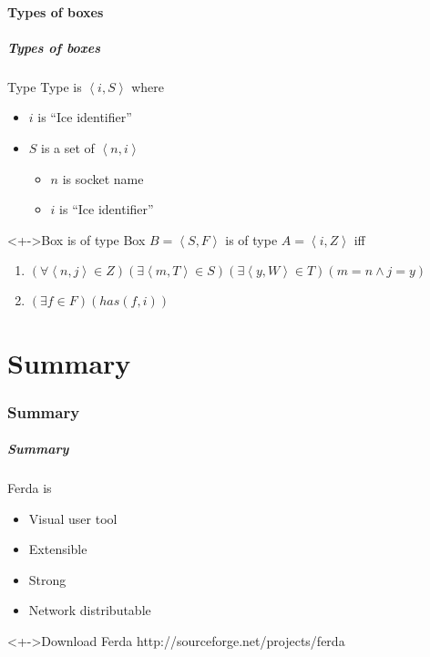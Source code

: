 \documentclass[handout]{beamer}
\begin{document}
\subsection{Types of boxes}
\begin{frame}
	\frametitle{Types of boxes}
	\begin{block}{Type}
		Type is $\left<i,S\right>$ where
		\begin{itemize}[<+->]
			\item $i$ is ``Ice identifier''
			\item $S$ is a set of $\left<n,i\right>$
			\begin{itemize}[<+->]
				\item $n$ is socket name
				\item $i$ is ``Ice identifier''
			\end{itemize}
		\end{itemize}
	\end{block}	
	\begin{block}<+->{Box is of type}
		Box $B=\left<S,F\right>$ is of type $A=\left<i,Z\right>$ iff 
		\begin{enumerate}[<+->]
			\item $(\forall \left<n,j\right>\in Z)(\exists \left<m,T\right>\in S)(\exists \left<y,W\right>\in T)(m=n \wedge j=y)$
			\item $(\exists f\in F)(has(f,i))$
		\end{enumerate}
	\end{block}
\end{frame}

\part{Summary}
\section{Summary}

\begin{frame}
	\frametitle{Summary}
	\begin{block}{Ferda is}
		\begin{itemize}[<+->]
			\item Visual user tool
			\item Extensible
			\item Strong
			\item Network distributable
		\end{itemize}
	\end{block}
	
	\begin{exampleblock}<+->{Download Ferda}
		http://sourceforge.net/projects/ferda
	\end{exampleblock}
\end{frame}
\end{document}

